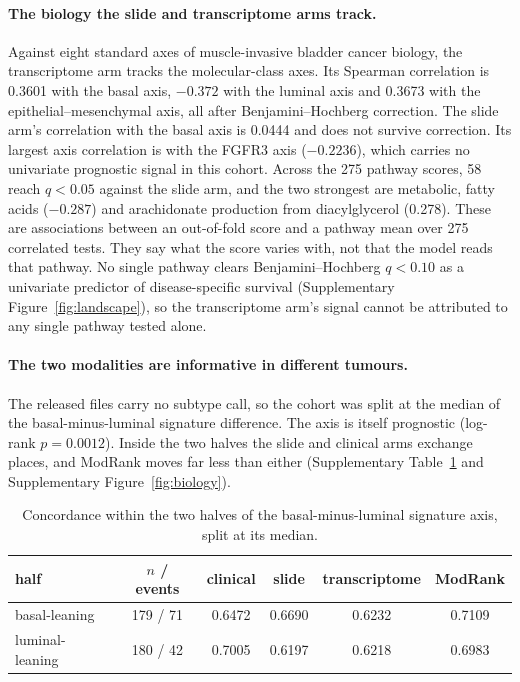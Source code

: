 \documentclass[11pt]{article}
\begin{document}
\paragraph{The biology the slide and transcriptome arms track.} Against eight standard axes of
muscle-invasive bladder cancer biology, the transcriptome arm tracks the molecular-class axes. Its
Spearman correlation is 0.3601 with the basal axis, $-0.372$ with the luminal axis and 0.3673 with the
epithelial--mesenchymal axis, all after Benjamini--Hochberg correction. The slide arm's correlation
with the basal axis is 0.0444 and does not survive correction. Its largest axis correlation is with
the FGFR3 axis ($-0.2236$), which carries no univariate prognostic signal in this cohort. Across the
275 pathway scores, 58 reach $q<0.05$ against the slide arm, and the two strongest are metabolic,
fatty acids ($-0.287$) and arachidonate production from diacylglycerol (0.278). These are
associations between an out-of-fold score and a pathway mean over 275 correlated tests. They say
what the score varies with, not that the model reads that pathway. No single pathway clears
Benjamini--Hochberg $q<0.10$ as a univariate predictor of disease-specific survival
(Supplementary Figure~\ref{fig:landscape}), so the transcriptome arm's signal cannot be attributed
to any single pathway tested alone.

\paragraph{The two modalities are informative in different tumours.} The released files carry no
subtype call, so the cohort was split at the median of the basal-minus-luminal signature
difference. The axis is itself prognostic (log-rank $p=0.0012$). Inside the two halves the slide and
clinical arms exchange places, and ModRank moves far less than either
(Supplementary Table~\ref{tab:subtype} and Supplementary Figure~\ref{fig:biology}).

\begin{table}[h]
\centering
{\small
\begin{tabular}{lccccc}
\toprule
half & $n$ / events & clinical & slide & transcriptome & ModRank \\
\midrule
basal-leaning & 179 / 71 & 0.6472 & 0.6690 & 0.6232 & 0.7109 \\
luminal-leaning & 180 / 42 & 0.7005 & 0.6197 & 0.6218 & 0.6983 \\
\bottomrule
\end{tabular}}
\caption{Concordance within the two halves of the basal-minus-luminal signature axis, split at its
median.}
\label{tab:subtype}
\end{table}
\end{document}
